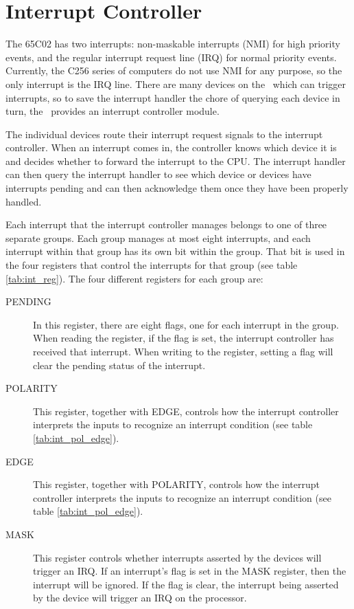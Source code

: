\chapter{Interrupt Controller}

The 65C02 has two interrupts: non-maskable interrupts (NMI) for high priority events, and the regular interrupt request line (IRQ) for normal priority events. Currently, the C256 series of computers do not use NMI for any purpose, so the only interrupt is the IRQ line. There are many devices on the \jr\ which can trigger interrupts, so to save the interrupt handler the chore of querying each device in turn, the \jr\ provides an interrupt controller module.

The individual devices route their interrupt request signals to the interrupt controller. When an interrupt comes in, the controller knows which device it is and decides whether to forward the interrupt to the CPU. The interrupt handler can then query the interrupt handler to see which device or devices have interrupts pending and can then acknowledge them once they have been properly handled.

Each interrupt that the interrupt controller manages belongs to one of three separate groups. Each group manages at most eight interrupts, and each interrupt within that group has its own bit within the group. That bit is used in the four registers that control the interrupts for that group (see table \ref{tab:int_reg}). The four different registers for each group are:

\begin{description}
    \item[PENDING] In this register, there are eight flags, one for each interrupt in the group. When reading the register, if the flag is set, the interrupt controller has received that interrupt. When writing to the register, setting a flag will clear the pending status of the interrupt.
    \item[POLARITY] This register, together with EDGE, controls how the interrupt controller interprets the inputs to recognize an interrupt condition (see table \ref{tab:int_pol_edge}).
    \item[EDGE] This register, together with POLARITY, controls how the interrupt controller interprets the inputs to recognize an interrupt condition (see table \ref{tab:int_pol_edge}).
    \item[MASK] This register controls whether interrupts asserted by the devices will trigger an IRQ. If an interrupt's flag is set in the MASK register, then the interrupt will be ignored. If the flag is clear, the interrupt being asserted by the device will trigger an IRQ on the processor.
\end{description}

